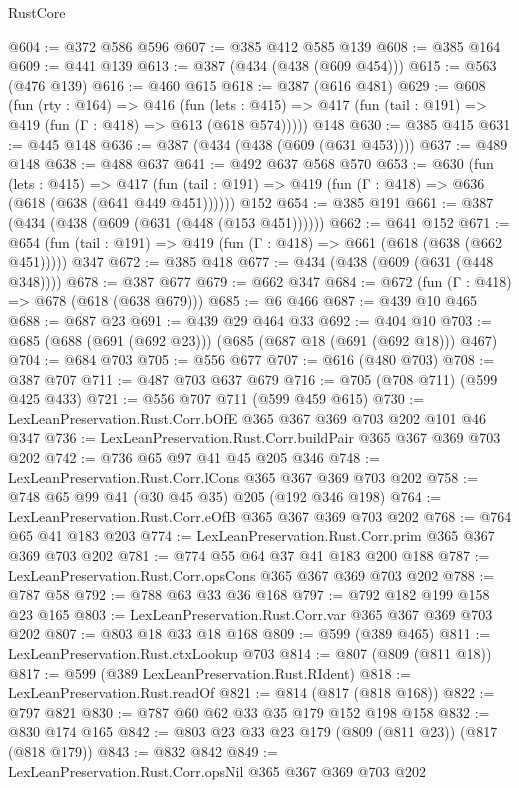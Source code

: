 \begin{lexlean}{RustCore}
\begin{coremodule}
{\begin{coremodule}
{{{{{@604 := @372 @586 @596
@607 := @385 @412 @585 @139
@608 := @385 @164
@609 := @441 @139
@613 := @387 (@434 (@438 (@609 @454)))
@615 := @563 (@476 @139)
@616 := @460 @615
@618 := @387 (@616 @481)
@629 := @608
    (fun (rty : @164) =>
    @416
      (fun (lets : @415) => @417 (fun (tail : @191) => @419 (fun (Γ : @418) => @613 (@618 @574)))))
    @148
@630 := @385 @415
@631 := @445 @148
@636 := @387 (@434 (@438 (@609 (@631 @453))))
@637 := @489 @148
@638 := @488 @637
@641 := @492 @637 @568 @570
@653 := @630
    (fun (lets : @415) =>
    @417 (fun (tail : @191) => @419 (fun (Γ : @418) => @636 (@618 (@638 (@641 @449 @451))))))
    @152
@654 := @385 @191
@661 := @387 (@434 (@438 (@609 (@631 (@448 (@153 @451))))))
@662 := @641 @152
@671 := @654 (fun (tail : @191) => @419 (fun (Γ : @418) => @661 (@618 (@638 (@662 @451))))) @347
@672 := @385 @418
@677 := @434 (@438 (@609 (@631 (@448 @348))))
@678 := @387 @677
@679 := @662 @347
@684 := @672 (fun (Γ : @418) => @678 (@618 (@638 @679)))
@685 := @6 @466
@687 := @439 @10 @465
@688 := @687 @23
@691 := @439 @29 @464 @33
@692 := @404 @10
@703 := @685 (@688 (@691 (@692 @23))) (@685 (@687 @18 (@691 (@692 @18))) @467)
@704 := @684 @703
@705 := @556 @677
@707 := @616 (@480 @703)
@708 := @387 @707
@711 := @487 @703 @637 @679
@716 := @705 (@708 @711) (@599 @425 @433)
@721 := @556 @707 @711 (@599 @459 @615)
@730 := LexLeanPreservation.Rust.Corr.bOfE @365 @367 @369 @703 @202 @101 @46 @347
@736 := LexLeanPreservation.Rust.Corr.buildPair @365 @367 @369 @703 @202
@742 := @736 @65 @97 @41 @45 @205 @346
@748 := LexLeanPreservation.Rust.Corr.lCons @365 @367 @369 @703 @202
@758 := @748 @65 @99 @41 (@30 @45 @35) @205 (@192 @346 @198)
@764 := LexLeanPreservation.Rust.Corr.eOfB @365 @367 @369 @703 @202
@768 := @764 @65 @41 @183 @203
@774 := LexLeanPreservation.Rust.Corr.prim @365 @367 @369 @703 @202
@781 := @774 @55 @64 @37 @41 @183 @200 @188
@787 := LexLeanPreservation.Rust.Corr.opsCons @365 @367 @369 @703 @202
@788 := @787 @58
@792 := @788 @63 @33 @36 @168
@797 := @792 @182 @199 @158 @23 @165
@803 := LexLeanPreservation.Rust.Corr.var @365 @367 @369 @703 @202
@807 := @803 @18 @33 @18 @168
@809 := @599 (@389 @465)
@811 := LexLeanPreservation.Rust.ctxLookup @703
@814 := @807 (@809 (@811 @18))
@817 := @599 (@389 LexLeanPreservation.Rust.RIdent)
@818 := LexLeanPreservation.Rust.readOf
@821 := @814 (@817 (@818 @168))
@822 := @797 @821
@830 := @787 @60 @62 @33 @35 @179 @152 @198 @158
@832 := @830 @174 @165
@842 := @803 @23 @33 @23 @179 (@809 (@811 @23)) (@817 (@818 @179))
@843 := @832 @842
@849 := LexLeanPreservation.Rust.Corr.opsNil @365 @367 @369 @703 @202
}}}}}
\end{coremodule}}
\end{coremodule}
\end{lexlean}
